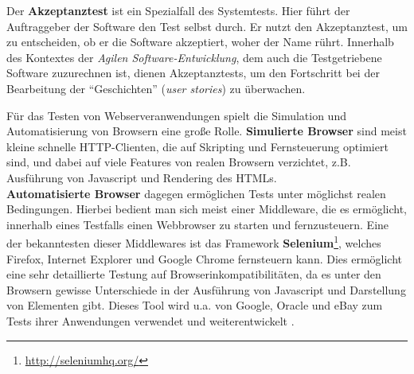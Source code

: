 Der \textbf{Akzeptanztest} ist ein Spezialfall des Systemtests. Hier führt der Auftraggeber der Software den Test selbst durch. Er nutzt den Akzeptanztest, um zu entscheiden, ob er die Software akzeptiert, woher der Name rührt.
Innerhalb des Kontextes der \textit{Agilen Software-Entwicklung}, dem auch die Testgetriebene Software zuzurechnen ist, dienen Akzeptanztests, um den Fortschritt bei der Bearbeitung der "`Geschichten"' (\textit{user stories}) zu überwachen.

Für das Testen von Webserveranwendungen spielt die Simulation und Automatisierung von Browsern eine große Rolle. \textbf{Simulierte Browser} sind meist kleine schnelle HTTP-Clienten, die auf Skripting und Fernsteuerung optimiert sind, und dabei auf viele Features von realen Browsern verzichtet, z.B. Ausführung von Javascript und Rendering des HTMLs. \\
\textbf{Automatisierte Browser} dagegen ermöglichen Tests unter möglichst realen Bedingungen. Hierbei bedient man sich meist einer Middleware, die es ermöglicht, innerhalb eines Testfalls einen Webbrowser zu starten und fernzusteuern. Eine der bekanntesten dieser Middlewares ist das Framework \textbf{Selenium}\footnote{\url{http://seleniumhq.org/}}, welches Firefox, Internet Explorer und Google Chrome fernsteuern kann. Dies ermöglicht eine sehr detaillierte Testung auf Browserinkompatibilitäten, da es unter den Browsern gewisse Unterschiede in der Ausführung von Javascript und Darstellung von Elementen gibt. Dieses Tool wird u.a. von Google, Oracle und eBay zum Tests ihrer Anwendungen verwendet und weiterentwickelt \citep{selenium_hq_selenium_2010}.
